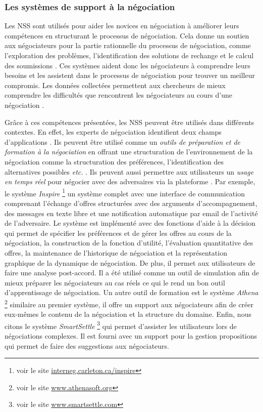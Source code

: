 		\subsubsection{Les systèmes de support à la négociation}
		\label{sec:1nss}
		
			 Les NSS sont utilisés pour aider les novices en négociation à améliorer leurs compétences en structurant le processus de négociation. Cela donne un soutien aux négociateurs pour la partie rationnelle du processus de négociation, comme l'exploration des problèmes, l'identification des solutions de rechange et le calcul des soumissions \cite{hindriks2008creating}. Ces systèmes aident donc les négociateurs à comprendre leurs besoins et les assistent dans le processus de négociation pour trouver un meilleur compromis. Les données collectées permettent aux chercheurs de mieux comprendre les difficultés que rencontrent les négociateurs au cours d'une négociation \cite{jonker2012negotiating}. 
			 
			 Grâce à ces compétences présentées, les NSS peuvent être utilisés dans différents contextes. En effet, les experts de négociation identifient deux champs d'applications \cite{pommeranz2009design}. Ils peuvent être utilisé comme un \textit{outils de préparation et de formation à la négociation} en offrant une structuration de l'environnement de la négociation comme la structuration des préférences, l'identification des alternatives possibles \emph{etc.} \cite{broekens2010affective}.  Ils peuvent aussi permettre aux utilisateurs un \textit{usage en temps réel} pour négocier avec des adversaires via la plateforme \cite{pommeranz2009design}. 
			 Par exemple, le système \emph{Inspire} \footnote{ voir le site \url{interneg.carleton.ca/inspire}} un système complet avec une interface de communication comprenant l'échange d'offres structurées avec des arguments d'accompagnement, des messages en texte libre et une notification automatique par email de l'activité de l'adversaire. Le système est implémenté avec des fonctions d'aide à la décision qui permet de spécifier les préférences et de gérer les offres au cours de la négociation, la construction de la fonction d'utilité, l'évaluation quantitative des offres, la maintenance de l'historique de négociation et la représentation graphique de la dynamique de négociation. De plus, il permet aux utilisateurs de faire une analyse post-accord. 
			 Il a été utilisé comme  un outil de simulation afin de mieux préparer les négociateurs au cas réels ce qui le rend un bon outil d'apprentissage de négociation. 
			 Un autre outil de formation est le système \emph{Athena} \footnote{ voir le site \url{www.athenasoft.org}} similaire au premier système, il offre un support aux négociateurs afin de créer eux-mêmes le contenu de la négociation et la structure du domaine. Enfin, nous citons le système \emph{SmartSettle} \footnote{ voir le site \url{www.smartsettle.com}} qui permet d'assister les utilisateurs lors de négociations complexes. Il est fourni avec un support pour la gestion propositions qui permet de faire des suggestions aux négociateurs. 
			 
